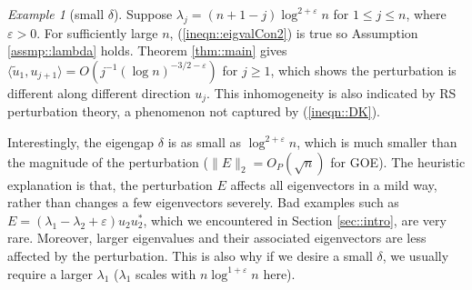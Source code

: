 \documentclass[12pt]{article}%
\theoremstyle{plain}%
\theoremstyle{remark}
\newtheorem{exm}{Example}[section]
\begin{document}
\begin{exm}[small $\delta$]
Suppose $\lambda_j = (n+1-j) \log^{2+\varepsilon}n$ for $1\le j \le n$, where $\varepsilon > 0$. For sufficiently large $n$, (\ref{ineqn::eigvalCon2}) is true so Assumption \ref{assmp::lambda} holds. Theorem \ref{thm::main} gives $\langle \tilde{u}_1, u_{j+1} \rangle = O(j^{-1}(\log n)^{-3/2 - \varepsilon})$ for $j\ge 1$, which shows the perturbation is different along different direction $u_j$. This inhomogeneity is also indicated by RS perturbation theory, a phenomenon not captured by (\ref{ineqn::DK}). 

Interestingly, the eigengap $\delta$ is as small as $\log^{2+\varepsilon} n$, which is much smaller than the magnitude of the perturbation ($\|E\|_2 = O_P(\sqrt{n})$ for GOE). The heuristic explanation is that, the perturbation $E$ affects all eigenvectors in a mild way, rather than changes a few eigenvectors severely. Bad examples such as $E = (\lambda_1 - \lambda_2 + \varepsilon) u_2 u_2^*$, which we encountered in Section \ref{sec::intro}, are very rare. Moreover, larger eigenvalues and their associated eigenvectors are less affected by the perturbation. This is also why if we desire a small $\delta$, we usually require a larger $\lambda_1$ ($\lambda_1$ scales with $n \log^{1+\varepsilon} n$ here). 



\end{exm}
\end{document}
